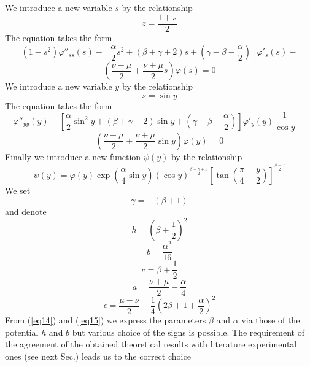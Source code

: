 \documentclass[singlespacing]{elsart}
\begin{document}
We introduce a new variable $s$ by the relationship
\begin{equation}
\label{eq8} z=\frac{1+s}{2}
\end{equation}
The equation takes the form
\[
\left(1-s^2\right)\varphi''_{ss}(s)-\left[\frac{\alpha}{2} s^2+(\beta+\gamma+2)s+\left(\gamma-\beta-\frac{\alpha}{2}\right)\right]\varphi'_s(s)-
\]
\begin{equation}
\label{eq9} \left(\frac{\nu-\mu}{2}+\frac{\nu+\mu}{2}s\right)\varphi (s)=0
\end{equation}
We introduce a new variable $y$ by the relationship
\begin{equation}
\label{eq10} s=\sin y
\end{equation}
The equation takes the form
\[
\varphi''_{yy}(y)-\left[\frac{\alpha}{2} \sin^2 y +(\beta+\gamma+2)\sin y+\left(\gamma-\beta-\frac{\alpha}{2}\right)\right]\varphi'_y(y)\frac{1}{\cos y}-
\]
\begin{equation}
\label{eq11} \left(\frac{\nu-\mu}{2}+\frac{\nu+\mu}{2}\sin y\right)\varphi (y)=0
\end{equation}
Finally we introduce a new function  $\psi (y)$ by the relationship
\begin{equation}
\label{eq12} \psi(y)=\varphi (y)\exp \left(\frac{\alpha}{4}\sin y \right)\left(\cos y\right)^{\frac{\beta+\gamma+1}{2}}\left[ \tan\left(\frac{\pi}{4}+\frac{y}{2}\right)\right]^{\frac{\beta-\gamma}{2}}
\end{equation}
We set
\begin{equation}
\label{eq13} \gamma=-\left(\beta+1\right)
\end{equation}
and denote
\begin{equation}
\label{eq14} h=\left(\beta+\frac{1}{2}\right)^2
\end{equation}
\begin{equation}
\label{eq15} b=\frac{\alpha^2}{16}
\end{equation}
\begin{equation}
\label{eq16} c=\beta+\frac{1}{2}
\end{equation}
\begin{equation}
\label{eq17} a=\frac{\nu+\mu}{2}-\frac{\alpha}{4}
\end{equation}
\begin{equation}
\label{eq18} \epsilon=\frac{\mu-\nu}{2}-\frac{1}{4}\left(2\beta+1+\frac{\alpha}{2}\right)^2
\end{equation}
From (\ref{eq14}) and (\ref{eq15}) we express the parameters $\beta$ and $\alpha$ via those of the potential $h$ and $b$ but various choice of the signs is possible. The requirement of the agreement of the obtained theoretical results with literature experimental ones (see next Sec.) leads us to the correct choice
\end{document}
